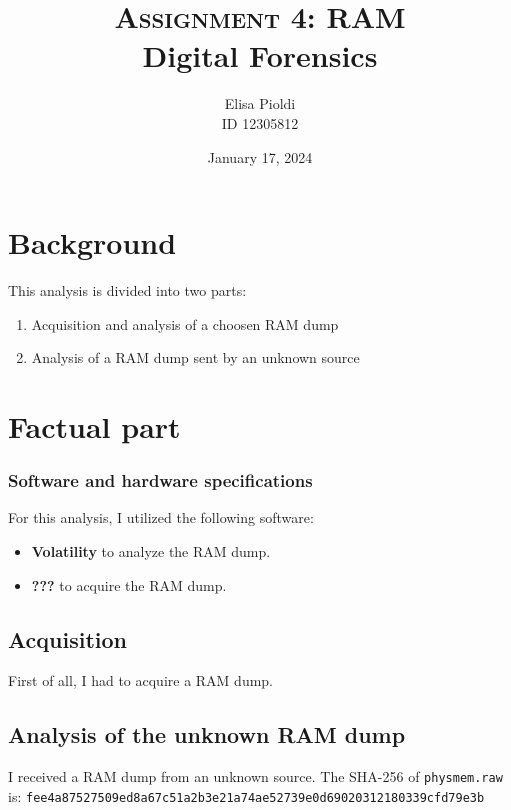\documentclass[12pt]{article}
\title{\textbf{\textsc{Assignment 4: RAM}}\\Digital Forensics}
\author{Elisa Pioldi\\
        ID 12305812}
\date{January 17, 2024}
\begin{document}
\maketitle

\section{Background}

This analysis is divided into two parts: 
\begin{enumerate}
        \item Acquisition and analysis of a choosen RAM dump
        \item Analysis of a RAM dump sent by an unknown source
\end{enumerate}

\section{Factual part}

\subsubsection{Software and hardware specifications}
\label{sec:specs}

For this analysis, I utilized the following software:

\begin{itemize}
    \item \textbf{Volatility} \cite{volatility} to analyze the RAM dump.
    \item \textbf{???} \cite{???} to acquire the RAM dump.
\end{itemize}

\subsection{Acquisition}

First of all, I had to acquire a RAM dump.


\subsection{Analysis of the unknown RAM dump}

I received a RAM dump from an unknown source. 
The SHA-256 of \texttt{physmem.raw} is:
\texttt{fee4a87527509ed8a67c51a2b3e21a74ae52739e0d69020312180339cfd79e3b}
\end{document}
